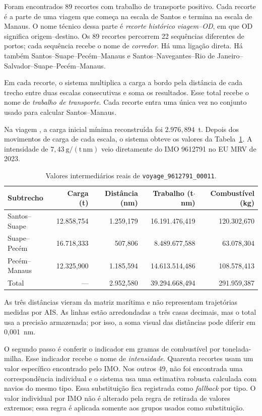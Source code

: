 Foram encontrados \num{89} recortes com trabalho de transporte positivo. Cada recorte é a parte de uma viagem que começa na escala de Santos e termina na escala de Manaus. O nome técnico dessa parte é \emph{recorte histórico viagem--OD}, em que OD significa origem--destino. Os 89 recortes percorrem \num{22} sequências diferentes de portos; cada sequência recebe o nome de \emph{corredor}. Há uma ligação direta. Há também Santos--Suape--Pecém--Manaus e Santos--Navegantes--Rio de Janeiro--Salvador--Suape--Pecém--Manaus.

Em cada recorte, o sistema multiplica a carga a bordo pela distância de cada trecho entre duas escalas consecutivas e soma os resultados. Esse total recebe o nome de \emph{trabalho de transporte}. Cada recorte entra uma única vez no conjunto usado para calcular Santos--Manaus.

Na viagem , a carga inicial mínima reconstruída foi \(2.976{,}894\)~t. Depois dos movimentos de carga de cada escala, o sistema obteve os valores da Tabela~\ref{tab:app-viagem-real-subtrechos}. A intensidade de \(7{,}43~\mathrm{g/(t\,nm)}\) veio diretamente do IMO 9612791 no EU MRV de 2023.

\begin{table}[htbp]
\centering
\small
\caption{Valores intermediários reais de \texttt{voyage\_9612791\_00011}.}
\label{tab:app-viagem-real-subtrechos}
\begin{tabular}{lrrrr}
\toprule
Subtrecho & Carga (t) & Distância (nm) & Trabalho (t$\cdot$nm) & Combustível (kg) \\
\midrule
Santos--Suape & 12.858,754 & 1.259,179 & 16.191.476,419 & 120.302,670 \\
Suape--Pecém & 16.718,333 & 507,806 & 8.489.677,588 & 63.078,304 \\
Pecém--Manaus & 12.325,900 & 1.185,594 & 14.613.514,486 & 108.578,413 \\
\midrule
Total & --- & 2.952,580 & 39.294.668,494 & 291.959,387 \\
\bottomrule
\end{tabular}
\end{table}

As três distâncias vieram da matriz marítima e não representam trajetórias medidas por AIS. As linhas estão arredondadas a três casas decimais, mas o total usa a precisão armazenada; por isso, a soma visual das distâncias pode diferir em 0,001~nm.

O segundo passo é conferir o indicador em gramas de combustível por tonelada-milha. Esse indicador recebe o nome de \emph{intensidade}. Quarenta recortes usam um valor específico encontrado pelo IMO. Nos outros 49, não foi encontrada uma correspondência individual e o sistema usa uma estimativa robusta calculada com navios do mesmo tipo. Essa substituição fica registrada como \emph{fallback} por tipo. O valor individual por IMO não é alterado pela regra de retirada de valores extremos; essa regra é aplicada somente aos grupos usados como substituição.

